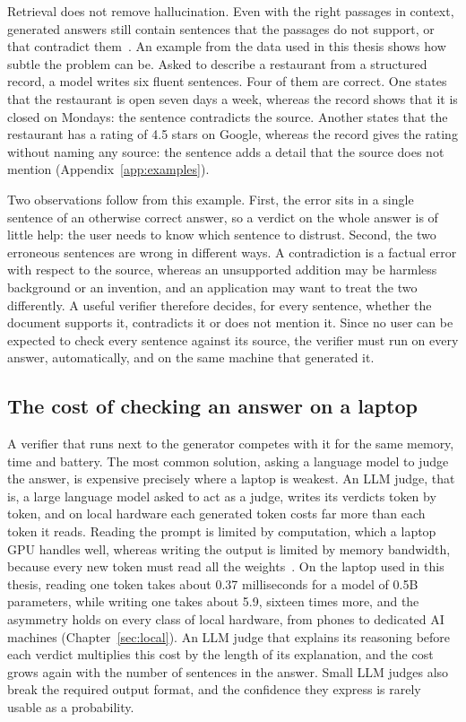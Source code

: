 Retrieval does not remove hallucination. Even with the right passages in context, generated answers still contain
sentences that the passages do not support, or that contradict them~\cite{niu2024ragtruth,huang2025hallucination}. An
example from the data used in this thesis shows how subtle the problem can be. Asked to describe a restaurant from a
structured record, a model writes six fluent sentences. Four of them are correct. One states that the restaurant is open
seven days a week, whereas the record shows that it is closed on Mondays: the sentence contradicts the source. Another
states that the restaurant has a rating of 4.5 stars on Google, whereas the record gives the rating without naming any
source: the sentence adds a detail that the source does not mention (Appendix~\ref{app:examples}).

Two observations follow from this example. First, the error sits in a single sentence of an otherwise correct answer, so
a verdict on the whole answer is of little help: the user needs to know which sentence to distrust. Second, the two
erroneous sentences are wrong in different ways. A contradiction is a factual error with respect to the source, whereas
an unsupported addition may be harmless background or an invention, and an application may want to treat the two
differently. A useful verifier therefore decides, for every sentence, whether the document supports it, contradicts it or
does not mention it. Since no user can be expected to check every sentence against its source, the verifier must run on
every answer, automatically, and on the same machine that generated it.

\subsection{The cost of checking an answer on a laptop}
\label{sec:intro-cost}

A verifier that runs next to the generator competes with it for the same memory, time and battery. The most common
solution, asking a language model to judge the answer, is expensive precisely where a laptop is weakest. An LLM judge, that is, a large language model asked to act as a judge, writes its verdicts token by token, and on local hardware each generated token costs far more than each token it reads. Reading
the prompt is limited by computation, which a laptop GPU handles well, whereas writing the output is limited by memory
bandwidth, because every new token must read all the weights~\cite{pope2023scaling}. On the laptop used in this thesis,
reading one token takes about 0.37 milliseconds for a model of 0.5B parameters, while writing one takes about 5.9, sixteen
times more, and the asymmetry holds on every class of local hardware, from phones to dedicated AI machines
(Chapter~\ref{sec:local}). An LLM judge that explains its reasoning before each verdict multiplies this cost by the length of its
explanation, and the cost grows again with the number of sentences in the answer. Small LLM judges also break the required
output format, and the confidence they express is rarely usable as a probability.

